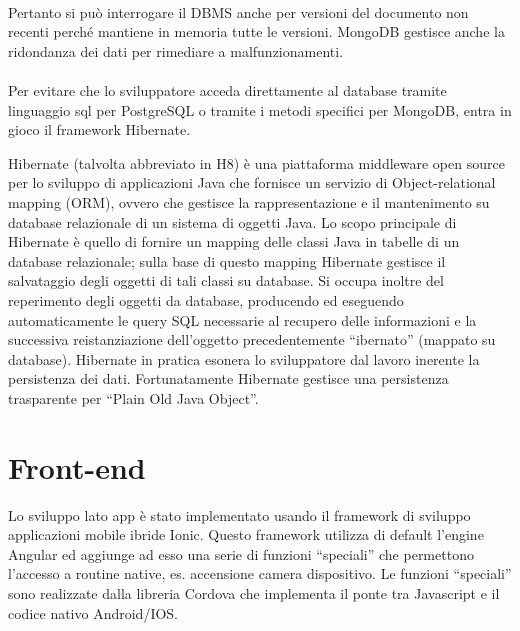 \paragraph{}

Pertanto si può interrogare il DBMS anche per versioni del documento non recenti perché mantiene in memoria tutte le versioni.
MongoDB gestisce anche la ridondanza dei dati per rimediare a malfunzionamenti.
\paragraph{}

Per evitare che lo sviluppatore acceda direttamente al database tramite linguaggio sql per PostgreSQL o tramite i metodi specifici per MongoDB,
entra in gioco il framework Hibernate.

Hibernate (talvolta abbreviato in H8) è una piattaforma middleware open source per lo sviluppo di applicazioni Java che fornisce un servizio di Object-relational mapping (ORM), ovvero che gestisce la rappresentazione e il mantenimento su database relazionale di un sistema di oggetti Java. Lo scopo principale di Hibernate è quello di fornire un mapping delle
classi Java in tabelle di un database relazionale; sulla base di questo
mapping Hibernate gestisce il salvataggio degli oggetti di tali classi su database. Si occupa inoltre del reperimento degli oggetti da database, producendo ed eseguendo automaticamente le query SQL necessarie al recupero delle informazioni e la successiva reistanziazione dell’oggetto precedentemente “ibernato” (mappato su database).
Hibernate in pratica esonera lo sviluppatore dal lavoro inerente la persistenza dei dati.
Fortunatamente Hibernate gestisce una persistenza trasparente per “Plain Old Java
Object”.


\section{Front-end}


Lo sviluppo lato app è stato implementato usando il framework di sviluppo applicazioni mobile ibride Ionic.
Questo framework utilizza di default l’engine Angular ed aggiunge ad esso una serie di funzioni “speciali” che permettono l’accesso a routine native, es. accensione camera dispositivo. Le funzioni “speciali” sono realizzate dalla libreria Cordova che implementa il ponte tra Javascript e il codice nativo Android/IOS.
\paragraph{}

